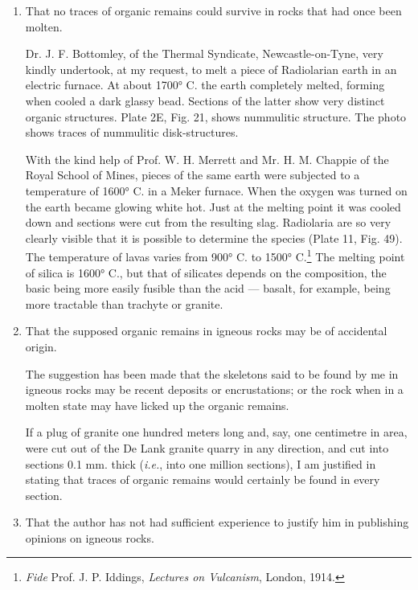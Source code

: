 \documentclass[a4paper, 12pt, oneside]{article}
\begin{document}
\begin{enumerate}
  \item That no traces of organic remains could survive in rocks that had once been molten.

\hspace*{5mm}Dr. J. F. Bottomley, of the Thermal Syndicate, Newcastle-on-Tyne, very kindly undertook, at my request, to melt a piece of Radiolarian earth in an electric furnace. At about 1700° C. the earth completely melted, forming when cooled a dark glassy bead. Sections of the latter show very distinct organic structures. Plate 2E, Fig. 21, shows nummulitic structure. The photo shows traces of nummulitic disk-structures.

\hspace*{5mm}With the kind help of Prof. W. H. Merrett and Mr. H. M. Chappie of the Royal School of Mines, pieces of the same earth were subjected to a temperature of 1600° C. in a Meker furnace. When the oxygen was turned on the earth became glowing white hot. Just at the melting point it was cooled down and sections were cut from the resulting slag. Radiolaria are so very clearly visible that it is possible to determine the species (Plate 11, Fig. 49). The temperature of lavas varies from 900° C. to 1500° C.\footnote{\emph{Fide} Prof. J. P. Iddings, \emph{Lectures on Vulcanism}, London, 1914.} The melting point of silica is 1600° C., but that of silicates depends on the composition, the basic being more easily fusible than the acid --- basalt, for example, being more tractable than trachyte or granite.

  \item That the supposed organic remains in igneous rocks may be of accidental origin.

\hspace*{5mm}The suggestion has been made that the skeletons said to be found by me in igneous rocks may be recent deposits or encrustations; or the rock when in a molten state may have licked up the organic remains.

\hspace*{5mm}If a plug of granite one hundred meters long and, say, one centimetre in area, were cut out of the De Lank granite quarry in any direction, and cut into sections 0.1 mm. thick (\emph{i.e.}, into one million sections), I am justified in stating that traces of organic remains would certainly be found in every section.

  \item That the author has not had sufficient experience to justify him in publishing opinions on igneous rocks.


\end{enumerate}
\end{document}
